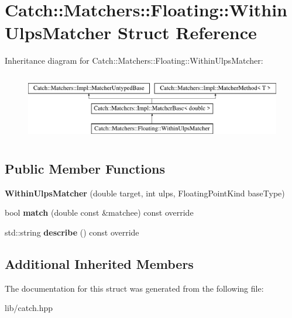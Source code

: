 \hypertarget{struct_catch_1_1_matchers_1_1_floating_1_1_within_ulps_matcher}{}\section{Catch\+:\+:Matchers\+:\+:Floating\+:\+:Within\+Ulps\+Matcher Struct Reference}
\label{struct_catch_1_1_matchers_1_1_floating_1_1_within_ulps_matcher}
Inheritance diagram for Catch\+:\+:Matchers\+:\+:Floating\+:\+:Within\+Ulps\+Matcher\+:\begin{figure}[H]
\begin{center}
\leavevmode
\includegraphics[height=2.968198cm]{struct_catch_1_1_matchers_1_1_floating_1_1_within_ulps_matcher}
\end{center}
\end{figure}
\subsection*{Public Member Functions}
\begin{DoxyCompactItemize}
\item 
\mbox{\label{struct_catch_1_1_matchers_1_1_floating_1_1_within_ulps_matcher_a836074ae4010275284ab66b2485c6575}} 
{\bfseries Within\+Ulps\+Matcher} (double target, int ulps, Floating\+Point\+Kind base\+Type)
\item 
\mbox{\label{struct_catch_1_1_matchers_1_1_floating_1_1_within_ulps_matcher_aabda42a0dc5d00f3c5916feb75006b32}} 
bool {\bfseries match} (double const \&matchee) const override
\item 
\mbox{\label{struct_catch_1_1_matchers_1_1_floating_1_1_within_ulps_matcher_ad9bc8bb7f3abd326580a4bf6cf369b1b}} 
std\+::string {\bfseries describe} () const override
\end{DoxyCompactItemize}
\subsection*{Additional Inherited Members}


The documentation for this struct was generated from the following file\+:\begin{DoxyCompactItemize}
\item 
lib/catch.\+hpp\end{DoxyCompactItemize}
